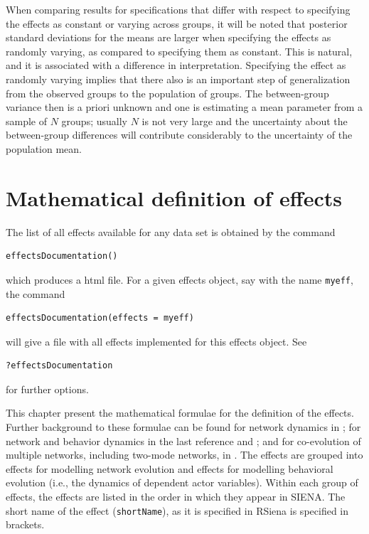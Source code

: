 \documentclass[a4paper,fleqn,11pt]{article}
\newcommand{\+}{\, + \,}
\newcommand{\RS}{{\sf \textsf{RSiena} }}
\newcommand{\si}{{\sf SIENA}}
\begin{document}
When comparing results for specifications that differ with respect
to specifying the effects as constant or varying across groups,
it will be noted that posterior standard deviations for the means
are larger when specifying the effects as randomly varying, as compared
to specifying them as constant. This is natural, and it is associated
with a difference in interpretation.
Specifying the effect as randomly varying implies that there also is
an important step of generalization from the observed groups to the population
of groups. The between-group variance then is a priori unknown and one is
estimating a mean parameter from a sample of $N$ groups; usually $N$ is not
very large and the uncertainty about the between-group differences
will contribute considerably to the uncertainty of the population mean.

\newpage
\section[Formulas for effects]{Mathematical definition of effects}
\label{S_math}

The list of all effects available for any data set is obtained by
the command
\begin{verbatim}
effectsDocumentation()
\end{verbatim}
which produces a html file.
For a given effects object, say with the name \texttt{myeff}, the command
\begin{verbatim}
effectsDocumentation(effects = myeff)
\end{verbatim}
will give a file with all effects implemented for this effects object.
See
\begin{verbatim}
?effectsDocumentation
\end{verbatim}
for further options.
\bigskip

This chapter present the mathematical formulae for the definition of the
effects. Further background to these formulae can be found
for network dynamics in \citet{Snijders01,Snijders05,SnijdersEA10b};
for network and behavior dynamics in the last reference and
\citet*{SteglichEA10}; and for co-evolution of multiple networks,
including two-mode networks, in \citet{SLT2013}.
The effects are grouped into effects for modelling network
evolution and effects for modelling behavioral evolution (i.e.,
the dynamics of dependent actor variables). Within each group of
effects, the effects are listed in the order in which they appear
in \si. The short name of the effect (\texttt{shortName}),
as it is specified in \RS is specified in brackets.
\end{document}
